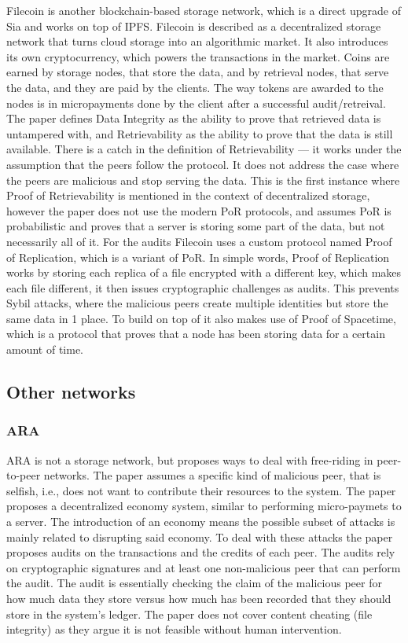 Filecoin \cite{filecoin} is another blockchain-based storage network,
which is a direct upgrade of Sia and works on top of IPFS.
Filecoin is described as a decentralized storage network that turns cloud storage into an algorithmic market.
It also introduces its own cryptocurrency, which powers the transactions in the market.
Coins are earned by storage nodes, that store the data, and by retrieval nodes, that serve the data,
and they are paid by the clients.
The way tokens are awarded to the nodes is in micropayments done by the client after a successful audit/retreival.
The paper defines Data Integrity as the ability to prove that retrieved data is untampered with,
and Retrievability as the ability to prove that the data is still available.
There is a catch in the definition of Retrievability --- it works under the assumption that the peers
follow the protocol.
It does not address the case where the peers are malicious and stop serving the data.
This is the first instance where Proof of Retrievability is mentioned in the context of decentralized storage,
however the paper does not use the modern PoR protocols, and assumes PoR is probabilistic and proves
that a server is storing some part of the data, but not necessarily all of it.
For the audits Filecoin uses a custom protocol named Proof of Replication, which is a variant of PoR.
In simple words, Proof of Replication works by storing each replica of a file encrypted with a different key,
which makes each file different, it then issues cryptographic challenges as audits.
This prevents Sybil attacks, where the malicious peers create multiple
identities but store the same data in 1 place.
To build on top of it also makes use of Proof of Spacetime, which is a protocol that proves that a node
has been storing data for a certain amount of time.

\subsection{Other networks}

\subsubsection{ARA}

ARA is not a storage network, but proposes ways to deal with free-riding in peer-to-peer networks.
The paper assumes a specific kind of malicious peer, that is selfish, i.e., does not want to contribute their resources to the system.
The paper proposes a decentralized economy system, similar to performing micro-paymets to a server.
The introduction of an economy means the possible subset of attacks is mainly related to disrupting said economy.
To deal with these attacks the paper proposes audits on the transactions and the credits of each peer.
The audits rely on cryptographic signatures and at least one non-malicious peer that can perform the audit.
The audit is essentially checking the claim of the malicious peer for how much data they store versus how much has been recorded that they should store in the system's ledger.
The paper does not cover content cheating (file integrity) as they argue it is not feasible without human intervention.

